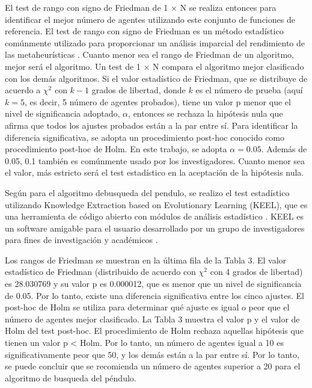 \documentclass[conference]{IEEEtran}
\begin{document}
El test de rango con signo de Friedman de 1 × N se realiza entonces para
identificar el mejor número de agentes utilizando este conjunto de funciones de
referencia. El test de rango con signo de Friedman es un método estadístico
comúnmente utilizado para proporcionar un análisis imparcial del rendimiento de
las metaheurísticas \cite{alcala-fdez2009, triguero2017, alcala-fdez2011}.
Cuanto menor sea el rango de Friedman de un algoritmo, mejor será el algoritmo.
Un test de 1 × N compara el algoritmo mejor clasificado con los demás
algoritmos. Si el valor estadístico de Friedman, que se distribuye de acuerdo a
$\chi^2$ con $k-1$ grados de libertad, donde $k$ es el número de prueba (aquí
$k=5$, es decir, 5 número de agentes probados), tiene un valor p menor que el
nivel de significancia adoptado, $\alpha$, entonces se rechaza la hipótesis
nula que afirma que todos los ajustes probados están a la par entre sí. Para
identificar la diferencia significativa, se adopta un procedimiento post-hoc
conocido como procedimiento post-hoc de Holm. En este trabajo, se adopta
$\alpha=0.05$. Además de 0.05, 0.1 también es comúnmente usado por los
investigadores. Cuanto menor sea el valor, más estricto será el test
estadístico en la aceptación de la hipótesis nula.

Según \cite{aziz2022} para el algoritmo debusqueda del pendulo, se realizo el
test estadístico
utilizando Knowledge Extraction based on Evolutionary Learning (KEEL), que es
una herramienta de código abierto
con módulos de análisis estadístico \cite{alcala-fdez2009, triguero2017,
    alcala-fdez2011}. KEEL es un software amigable para el usuario desarrollado
por
un grupo de investigadores para fines de investigación y académicos
\cite{alcala-fdez2009, triguero2017, alcala-fdez2011}.

Los rangos de Friedman se muestran en la última fila de la Tabla 3. El valor
estadístico de Friedman (distribuido de acuerdo con $\chi^2$ con 4 grados de
libertad) es 28.030769 y su valor p es 0.000012, que es menor que un nivel de
significancia de 0.05. Por lo tanto, existe una diferencia significativa entre
los cinco ajustes. El post-hoc de Holm se utiliza para determinar qué ajuste es
igual o peor que el número de agentes mejor clasificado. La Tabla 3 muestra el
valor p y el valor de Holm del test post-hoc. El procedimiento de Holm rechaza
aquellas hipótesis que tienen un valor p < Holm. Por lo tanto, un número de
agentes igual a 10 es significativamente peor que 50, y los demás están a la
par entre sí. Por lo tanto, se puede concluir que se recomienda un número de
agentes superior a 20 para el algoritmo de busqueda del péndulo.
\end{document}
